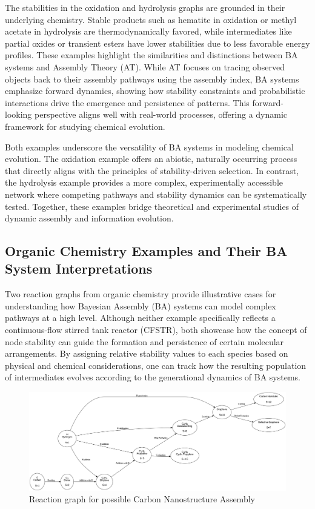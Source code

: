 \documentclass[entropy,article,submit,pdftex,moreauthors]{Definitions/mdpi}
\begin{document}
The stabilities in the oxidation and hydrolysis graphs are grounded in their underlying chemistry. Stable products such as hematite in oxidation or methyl acetate in hydrolysis are thermodynamically favored, while intermediates like partial oxides or transient esters have lower stabilities due to less favorable energy profiles. These examples highlight the similarities and distinctions between BA systems and Assembly Theory (AT). While AT focuses on tracing observed objects back to their assembly pathways using the assembly index, BA systems emphasize forward dynamics, showing how stability constraints and probabilistic interactions drive the emergence and persistence of patterns. This forward-looking perspective aligns well with real-world processes, offering a dynamic framework for studying chemical evolution.

Both examples underscore the versatility of BA systems in modeling chemical evolution. The oxidation example offers an abiotic, naturally occurring process that directly aligns with the principles of stability-driven selection. In contrast, the hydrolysis example provides a more complex, experimentally accessible network where competing pathways and stability dynamics can be systematically tested. Together, these examples bridge theoretical and experimental studies of dynamic assembly and information evolution.

\subsection{Organic Chemistry Examples and Their BA System Interpretations}
\label{sec:organic-ba-examples}

Two reaction graphs from organic chemistry provide illustrative cases for understanding how Bayesian Assembly (BA) systems can model complex pathways at a high level. Although neither example specifically reflects a continuous-flow stirred tank reactor (CFSTR), both showcase how the concept of node stability can guide the formation and persistence of certain molecular arrangements. By assigning relative stability values to each species based on physical and chemical considerations, one can track how the resulting population of intermediates evolves according to the generational dynamics of BA systems.

\begin{figure}[h]
    \centering
    \includegraphics[width=1\textwidth]{abc_nano.png}
    \caption{Reaction graph for possible Carbon Nanostructure Assembly}
    \label{fig:abc_nano}
\end{figure}
\end{document}

